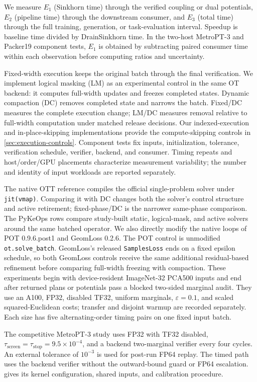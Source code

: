 We measure $E_1$ (Sinkhorn time) through the verified coupling or dual potentials, $E_2$ (pipeline time) through the downstream consumer, and $E_3$ (total time) through the full training, generation, or task-evaluation interval. Speedup is baseline time divided by DrainSinkhorn time. In the two-host MetroPT-3 and Packer19 component tests, $E_1$ is obtained by subtracting paired consumer time within each observation before computing ratios and uncertainty.

Fixed-width execution keeps the original batch through the final verification. We implement logical masking (LM) as an experimental control in the same OT backend: it computes full-width updates and freezes completed states. Dynamic compaction (DC) removes completed state and narrows the batch. Fixed/DC measures the complete execution change; LM/DC measures removal relative to full-width computation under matched release decisions. Our indexed-execution and in-place-skipping implementations provide the compute-skipping controls in \cref{sec:execution-controls}. Component tests fix inputs, initialization, tolerance, verification schedule, verifier, backend, and consumer. Timing repeats and host/order/GPU placements characterize measurement variability; the number and identity of input workloads are reported separately.

The native OTT reference compiles the official single-problem solver under \texttt{jit(vmap)}. Comparing it with DC changes both the solver's control structure and active retirement; fixed-phase/DC is the narrower same-phase comparison. The PyKeOps rows compare study-built static, logical-mask, and active solvers around the same batched operator. We also directly modify the native loops of POT 0.9.6.post1 and GeomLoss 0.2.6. The POT control is unmodified \texttt{ot.solve\_batch}. GeomLoss's released \texttt{SamplesLoss} ends on a fixed epsilon schedule, so both GeomLoss controls receive the same additional residual-based refinement before comparing full-width freezing with compaction. These experiments begin with device-resident ImageNet-32 PCA500 inputs and end after returned plans or potentials pass a blocked two-sided marginal audit. They use an A100, FP32, disabled TF32, uniform marginals, $\varepsilon=0.1$, and scaled squared-Euclidean costs; transfer and disjoint warmup are recorded separately. Each size has five alternating-order timing pairs on one fixed input batch.

The competitive MetroPT-3 study uses FP32 with TF32 disabled, $\tau_{\mathrm{screen}}=\tau_{\mathrm{stop}}=9.5\times10^{-4}$, and a backend two-marginal verifier every four cycles. An external tolerance of $10^{-3}$ is used for post-run FP64 replay. The timed path uses the backend verifier without the outward-bound guard or FP64 escalation.  gives its kernel configuration, shared inputs, and calibration procedure.

